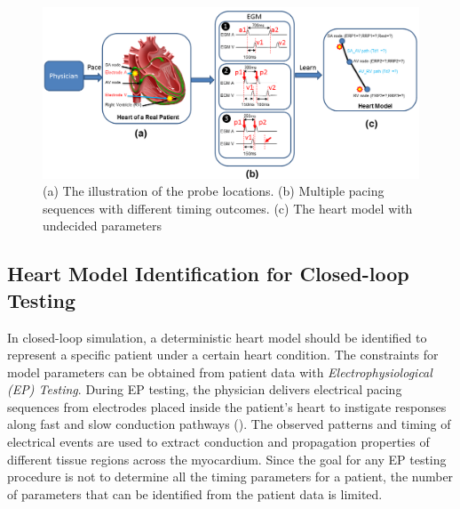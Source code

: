 \begin{figure}[!b]
\centering
		\includegraphics[width=0.9  \textwidth]{figs/modelID.png}
		
\caption{\small (a) The illustration of the probe locations. (b) Multiple pacing sequences with different timing outcomes. (c) The heart model with undecided parameters}
\label{fig:modelID}
\end{figure} 

\subsection{Heart Model Identification for Closed-loop Testing}
In closed-loop simulation, a deterministic heart model should be identified to represent a specific patient under a certain heart condition. The constraints for model parameters can be obtained from patient data with \emph{Electrophysiological (EP) Testing}. During EP testing, the physician delivers electrical pacing sequences from electrodes placed inside the patient's heart to instigate responses along fast and slow conduction pathways (). The observed patterns and timing of electrical events are used to extract conduction and propagation properties of different tissue regions across the myocardium. Since the goal for any EP testing procedure is not to determine all the timing parameters for a patient, the number of parameters that can be identified from the patient data is limited.    

